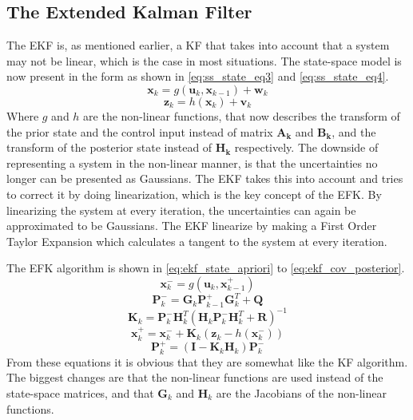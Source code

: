 \documentclass[Main]{subfiles}
\begin{document}
\subsection{The Extended Kalman Filter}
The EKF is, as mentioned earlier, a KF that takes into account that a system may not be linear, which is the case in most situations.
The state-space model is now present in the form as shown in \autoref{eq:ss_state_eq3} and \autoref{eq:ss_state_eq4}.
\begin{equation}
\label{eq:ss_state_eq3}
\mathbf{x}_k = g(\mathbf{u}_k,\mathbf{x}_{k-1}) + \mathbf{w}_k
\end{equation}
\begin{equation}
\label{eq:ss_state_eq4}
\mathbf{z}_k = h(\mathbf{x}_k) + \mathbf{v}_k
\end{equation}
Where $g$ and $h$ are the non-linear functions, that now describes the transform of the prior state and the control input instead of matrix $\mathbf{A_k}$ and $\mathbf{B_k}$, and the transform of the posterior state instead of $\mathbf{H_k}$ respectively.
The downside of representing a system in the non-linear manner, is that the uncertainties no longer can be presented as Gaussians.
The EKF takes this into account and tries to correct it by doing linearization, which is the key concept of the EFK.
By linearizing the system at every iteration, the uncertainties can again be approximated to be Gaussians.
The EKF linearize by making a First Order Taylor Expansion which calculates a tangent to the system at every iteration.

The EFK algorithm is shown in \autoref{eq:ekf_state_apriori} to \autoref{eq:ekf_cov_posterior}.
\begin{equation}
\label{eq:ekf_state_apriori}
\mathbf{x}_k^- = g(\mathbf{u}_k,\mathbf{x}_{k-1}^+) 
\end{equation}
\begin{equation}
\mathbf{P}_k^- = \mathbf{G}_k \mathbf{P}_{k-1}^+ \mathbf{G}_k^T+\mathbf{Q}
\end{equation}
\begin{equation}
\mathbf{K}_k = \mathbf{P}_k^- \mathbf{H}_k^T (\mathbf{H}_k \mathbf{P}_k^- \mathbf{H}_k^T + \mathbf{R})^{-1}
\end{equation}
\begin{equation}
\mathbf{x}_k^+ = \mathbf{x}_k^- + \mathbf{K}_k (\mathbf{z}_k - h(\mathbf{x}_k^-))
\end{equation}
\begin{equation}
\label{eq:ekf_cov_posterior}
\mathbf{P}_k^+ = (\mathbf{I} - \mathbf{K}_k \mathbf{H}_k) \mathbf{P}_k^-
\end{equation}
From these equations it is obvious that they are somewhat like the KF algorithm.
The biggest changes are that the non-linear functions are used instead of the state-space matrices, and that $\mathbf{G}_k$ and $\mathbf{H}_k$ are the Jacobians of the non-linear functions.

\end{document}
